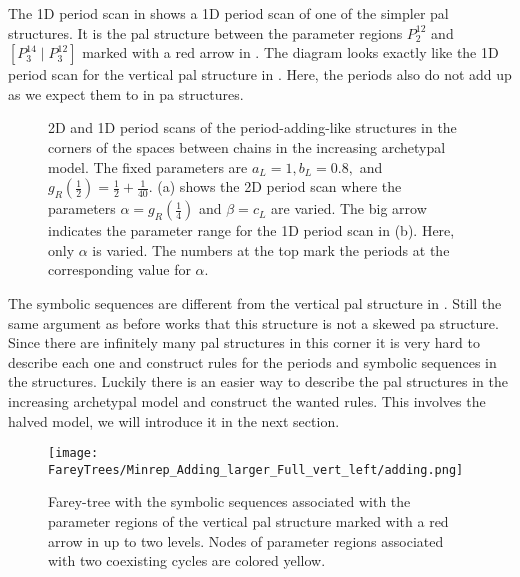 The 1D period scan in  shows a 1D period scan of one of the simpler \gls{pal} structures.
It is the \gls{pal} structure between the parameter regions $P^{12}_2$ and $\left[P^{14}_3 \mid P^{12}_3\right]$ marked with a red arrow in .
The diagram looks exactly like the 1D period scan for the vertical \gls{pal} structure in .
Here, the periods also do not add up as we expect them to in \gls{pa} structures.

\begin{figure}
	\centering
	\caption[2D and 1D period scans of period-adding-like structures in the corners of the spaces between chains in the increasing archetypal model]{
		2D and 1D period scans of the period-adding-like structures in the corners of the spaces between chains in the increasing archetypal model.
		The fixed parameters are $a_L = 1, b_L = 0.8,$ and $g_R\left(\frac{1}{2}\right) = \frac{1}{2} + \frac{1}{40}$.
		(a) shows the 2D period scan where the parameters $\alpha = g_R\left(\frac{1}{4}\right)$ and $\beta = c_L$ are varied.
		The big arrow indicates the parameter range for the 1D period scan in (b).
		Here, only $\alpha$ is varied.
		The numbers at the top mark the periods at the corresponding value for $\alpha$.
	}
	\label{fig:add.add.like.corn}
\end{figure}

The symbolic sequences are different from the vertical \gls{pal} structure in .
Still the same argument as before works that this structure is not a skewed \gls{pa} structure.
Since there are infinitely many \gls{pal} structures in this corner it is very hard to describe each one and construct rules for the periods and symbolic sequences in the structures.
Luckily there is an easier way to describe the \gls{pal} structures in the increasing archetypal model and construct the wanted rules.
This involves the halved model, we will introduce it in the next section.

\begin{figure}
	\centering
	\texttt{[image: FareyTrees/Minrep\_Adding\_larger\_Full\_vert\_left/adding.png]}
	\caption[Farey-tree with the symbolic sequences of a vertical  structure]{
		Farey-tree with the symbolic sequences associated with the parameter regions of the vertical \gls{pal} structure marked with a red arrow in  up to two levels.
		Nodes of parameter regions associated with two coexisting cycles are colored yellow.
	}
	\label{fig:add.add.like.vert.tree}
\end{figure}
